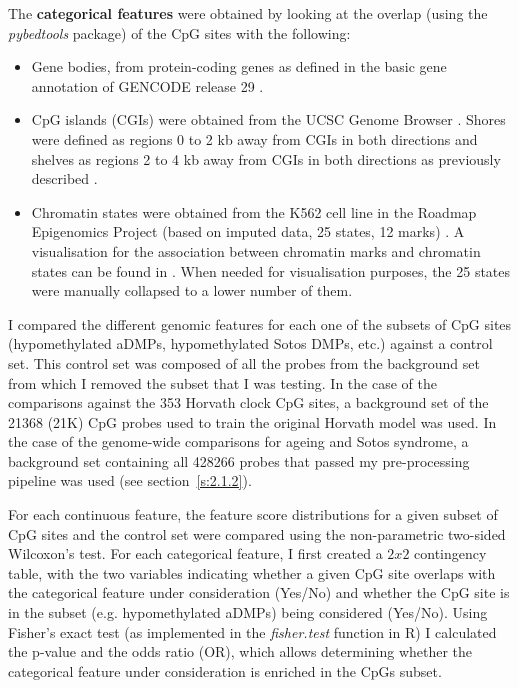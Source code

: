 The \textbf{categorical features} were obtained by looking at the overlap (using the \textit{pybedtools} package) \citep{Quinlan2011} of the CpG sites with the following:

\begin{itemize}
	
	\item Gene bodies, from protein-coding genes as defined in the basic gene annotation of GENCODE release 29 \citep{Frankish2018}.
	
	\item CpG islands (\acrshort{CGI}s) were obtained from the UCSC Genome Browser \citep{Bock2007}. Shores were defined as regions 0 to 2 kb away from CGIs in both directions and shelves as regions 2 to 4 kb away from CGIs in both directions as previously described \citep{Zhang2015,Martin-Herranz2017a}.
	
	\item Chromatin states were obtained from the K562 cell line in the Roadmap Epigenomics Project (based on imputed data, 25 states, 12 marks) \citep{Consortium}. A visualisation for the association between chromatin marks and chromatin states can be found in \citep{Consortiuma}. When needed for visualisation purposes, the 25 states were manually collapsed to a lower number of them.
	
\end{itemize}

I compared the different genomic features for each one of the subsets of CpG sites (hypomethylated aDMPs, hypomethylated Sotos DMPs, etc.) against a control set. This control set was composed of all the probes from the background set from which I removed the subset that I was testing. In the case of the comparisons against the 353 Horvath clock CpG sites, a background set of the 21368 (21K) CpG probes used to train the original Horvath model \citep{Horvath2013} was used. In the case of the genome-wide comparisons for ageing and Sotos syndrome, a background set containing all 428266 probes that passed my pre-processing pipeline was used (see section~\ref{s:2.1.2}).

\bigskip

For each continuous feature, the feature score distributions for a given subset of CpG sites and the control set were compared using the non-parametric two-sided Wilcoxon's test. For each categorical feature, I first created a $2x2$ contingency table, with the two variables indicating whether a given CpG site overlaps with the categorical feature under consideration (Yes/No) and whether the CpG site is in the subset (e.g. hypomethylated aDMPs) being considered (Yes/No). Using Fisher's exact test (as implemented in the \textit{fisher.test} function in R) I calculated the p-value and the odds ratio (\acrshort{OR}), which allows determining whether the categorical feature under consideration is enriched in the CpGs subset. 

